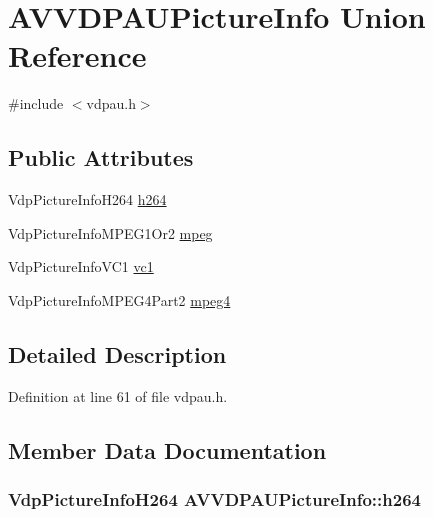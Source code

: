 \hypertarget{union_a_v_v_d_p_a_u_picture_info}{}\section{A\+V\+V\+D\+P\+A\+U\+Picture\+Info Union Reference}
\label{union_a_v_v_d_p_a_u_picture_info}


{\ttfamily \#include $<$vdpau.\+h$>$}

\subsection*{Public Attributes}
\begin{DoxyCompactItemize}
\item 
Vdp\+Picture\+Info\+H264 \hyperlink{union_a_v_v_d_p_a_u_picture_info_a9b04dee7006f93e2b2cede4316d99673}{h264}
\item 
Vdp\+Picture\+Info\+M\+P\+E\+G1\+Or2 \hyperlink{union_a_v_v_d_p_a_u_picture_info_a0953a7bad8855265a7dc4959d7ef7316}{mpeg}
\item 
Vdp\+Picture\+Info\+V\+C1 \hyperlink{union_a_v_v_d_p_a_u_picture_info_a0d054be4e5fbebdc6d723f6a1498117e}{vc1}
\item 
Vdp\+Picture\+Info\+M\+P\+E\+G4\+Part2 \hyperlink{union_a_v_v_d_p_a_u_picture_info_a03ba529bc77155578dd37aee7bb86af9}{mpeg4}
\end{DoxyCompactItemize}


\subsection{Detailed Description}


Definition at line 61 of file vdpau.\+h.



\subsection{Member Data Documentation}
\subsubsection[{\texorpdfstring{h264}{h264}}]{\setlength{\rightskip}{0pt plus 5cm}Vdp\+Picture\+Info\+H264 A\+V\+V\+D\+P\+A\+U\+Picture\+Info\+::h264}\hypertarget{union_a_v_v_d_p_a_u_picture_info_a9b04dee7006f93e2b2cede4316d99673}{}\label{union_a_v_v_d_p_a_u_picture_info_a9b04dee7006f93e2b2cede4316d99673}


